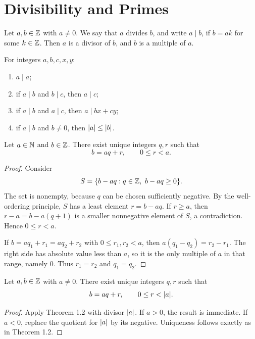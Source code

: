 \chapter{Divisibility and Primes}

\begin{de}
Let $a,b\in\mathbb{Z}$ with $a\ne0$.  We say that $a$ divides $b$, and write $a\mid b$, if $b=ak$ for some $k\in\mathbb{Z}$.  Then $a$ is a divisor of $b$, and $b$ is a multiple of $a$.
\end{de}

\begin{thm}
For integers $a,b,c,x,y$:
\begin{enumerate}[label=(\alph*)]
\item $a\mid a$;
\item if $a\mid b$ and $b\mid c$, then $a\mid c$;
\item if $a\mid b$ and $a\mid c$, then $a\mid bx+cy$;
\item if $a\mid b$ and $b\ne0$, then $\lvert a\rvert\le\lvert b\rvert$.
\end{enumerate}
\end{thm}

\begin{thm}
Let $a\in\mathbb{N}$ and $b\in\mathbb{Z}$.  There exist unique integers $q,r$ such that
\[
 b=aq+r,\qquad 0\le r<a.
\]
\end{thm}
\begin{proof}
Consider
\[
 S=\{b-aq:q\in\mathbb{Z},\ b-aq\ge0\}.
\]
The set is nonempty, because $q$ can be chosen sufficiently negative.  By the well-ordering principle, $S$ has a least element $r=b-aq$.  If $r\ge a$, then $r-a=b-a(q+1)$ is a smaller nonnegative element of $S$, a contradiction.  Hence $0\le r<a$.

If $b=aq_1+r_1=aq_2+r_2$ with $0\le r_1,r_2<a$, then
$a(q_1-q_2)=r_2-r_1$.  The right side has absolute value less than $a$, so it is the only multiple of $a$ in that range, namely $0$.  Thus $r_1=r_2$ and $q_1=q_2$.
\end{proof}

\begin{thm}
Let $a,b\in\mathbb{Z}$ with $a\ne0$.  There exist unique integers $q,r$ such that
\[
 b=aq+r,\qquad 0\le r<\lvert a\rvert.
\]
\end{thm}
\begin{proof}
Apply Theorem 1.2 with divisor $\lvert a\rvert$.  If $a>0$, the result is immediate.  If $a<0$, replace the quotient for $\lvert a\rvert$ by its negative.  Uniqueness follows exactly as in Theorem 1.2.
\end{proof}

